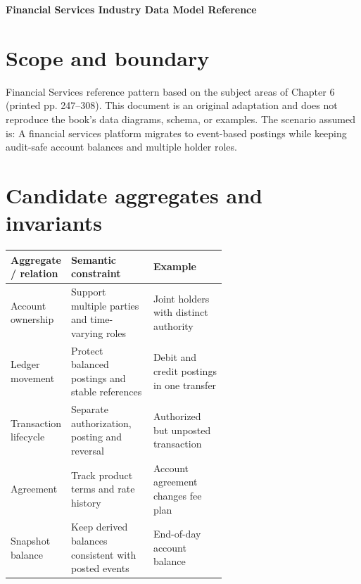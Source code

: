 \documentclass[11pt,letterpaper]{article}
\begin{document}
\begin{center}
{\LARGE\bfseries\color{navy} Financial Services Industry Data Model Reference}\par
\vspace{0.25em}{\large Conceptual to logical reference | original adaptation}\par
{}
\end{center}
\vspace{0.8em}
\section{Scope and boundary}
Financial Services reference pattern based on the subject areas of Chapter 6 (printed pp. 247--308). This document is an original adaptation and does not reproduce the book's data diagrams, schema, or examples. The scenario assumed is: A financial services platform migrates to event-based postings while keeping audit-safe account balances and multiple holder roles.


\section{Candidate aggregates and invariants}
\begin{tabularx}{\linewidth}{@{}>{\raggedright\arraybackslash}p{0.23\linewidth} >{\raggedright\arraybackslash}p{0.38\linewidth}>{\raggedright\arraybackslash}X@{}}
\toprule
\textbf{Aggregate / relation} & \textbf{Semantic constraint} & \textbf{Example} \\ 
\midrule
Account ownership & Support multiple parties and time-varying roles & Joint holders with distinct authority \\ 
Ledger movement & Protect balanced postings and stable references & Debit and credit postings in one transfer \\ 
Transaction lifecycle & Separate authorization, posting and reversal & Authorized but unposted transaction \\ 
Agreement & Track product terms and rate history & Account agreement changes fee plan \\ 
Snapshot balance & Keep derived balances consistent with posted events & End-of-day account balance \\ 
\bottomrule
\end{tabularx}
\end{document}
